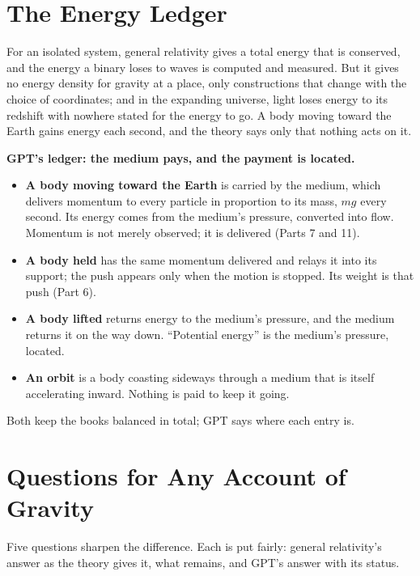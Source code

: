 \documentclass[11pt,a4paper]{article}
\begin{document}
\section{The Energy Ledger}

 For an isolated system, general relativity gives a total energy that is conserved, and the energy a binary loses to waves is computed and measured. But it gives no energy density for gravity at a place, only constructions that change with the choice of coordinates; and in the expanding universe, light loses energy to its redshift with nowhere stated for the energy to go. A body moving toward the Earth gains energy each second, and the theory says only that nothing acts on it.

\begin{hypbar}
\textbf{GPT's ledger: the medium pays, and the payment is located.}
\begin{itemize}
\item \textbf{A body moving toward the Earth} is carried by the medium, which delivers momentum to every particle in proportion to its mass, $mg$ every second. Its energy comes from the medium's pressure, converted into flow. Momentum is not merely observed; it is delivered (Parts 7 and 11).
\item \textbf{A body held} has the same momentum delivered and relays it into its support; the push appears only when the motion is stopped. Its weight is that push (Part 6).
\item \textbf{A body lifted} returns energy to the medium's pressure, and the medium returns it on the way down. ``Potential energy'' is the medium's pressure, located.
\item \textbf{An orbit} is a body coasting sideways through a medium that is itself accelerating inward. Nothing is paid to keep it going.
\end{itemize}
\end{hypbar}

 Both keep the books balanced in total; GPT says where each entry is.

\section{Questions for Any Account of Gravity}

Five questions sharpen the difference. Each is put fairly: general relativity's answer as the theory gives it, what remains, and GPT's answer with its status.
\end{document}
